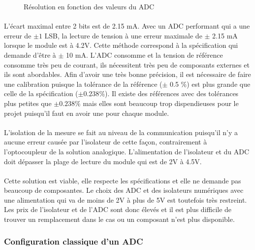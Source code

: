 \begin{figure}[H]
\begin{minipage}{0.45\textwidth}
			\caption{Résolution en fonction des valeurs du ADC}
			\label{fig:res_vref}
		\end{minipage}	
	\end{figure}	
	
	\paragraph*{}
	L'écart maximal entre 2 bits est de 2.15 mA. Avec un ADC performant qui a une erreur de $\pm 1$ LSB, la lecture de tension à une erreur maximale de $\pm $ 2.15 mA lorsque le module est à 4.2V. Cette méthode correspond à la spécification qui demande d'être à $\pm $ 10 mA. L'ADC consomme et la tension de référence consomme très peu de courant, ils nécessitent très peu de composants externes et ils sont abordables. Afin d'avoir une très bonne précision, il est nécessaire de faire une calibration puisque la tolérance de la référence ($\pm$ 0.5 \%) est plus grande que celle de la spécification ($\pm 0.238 \%$). Il existe des références avec des tolérances plus petites que $\pm 0.238 \%$ mais elles sont beaucoup trop dispendieuses pour le projet puisqu'il faut en avoir une pour chaque module.    
	
	\paragraph*{}
	L'isolation de la mesure se fait au niveau de la communication puisqu'il n'y a aucune erreur causée par l'isolateur de cette façon, contrairement à l'optocoupleur de la solution analogique. L'alimentation de l'isolateur et du ADC doit dépasser la plage de lecture du module qui est de 2V à 4.5V.
	
	\paragraph*{}
	Cette solution est viable, elle respecte les spécifications et elle ne demande pas beaucoup de composantes. Le choix des ADC et des isolateurs numériques avec une alimentation qui va de moins de 2V à plus de 5V est toutefois très restreint. Les prix de l'isolateur et de l'ADC sont donc élevés et il est plus difficile de trouver un remplacement dans le cas ou un composant n'est plus disponible.   
	
	\subsubsection*{Configuration classique d'un ADC}
